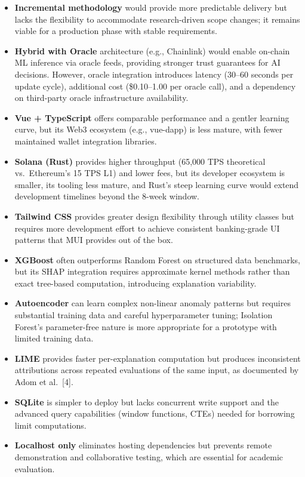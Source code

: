 \documentclass[12pt,a4paper]{report}
\begin{document}
\begin{itemize}[noitemsep]
\item \textbf{Incremental methodology} would provide more predictable delivery but lacks the flexibility to accommodate research-driven scope changes; it remains viable for a production phase with stable requirements.

\item \textbf{Hybrid with Oracle} architecture (e.g., Chainlink) would enable on-chain ML inference via oracle feeds, providing stronger trust guarantees for AI decisions. However, oracle integration introduces latency (30--60 seconds per update cycle), additional cost (\$0.10--1.00 per oracle call), and a dependency on third-party oracle infrastructure availability.

\item \textbf{Vue + TypeScript} offers comparable performance and a gentler learning curve, but its Web3 ecosystem (e.g., vue-dapp) is less mature, with fewer maintained wallet integration libraries.

\item \textbf{Solana (Rust)} provides higher throughput (65,000 TPS theoretical vs.\ Ethereum's 15 TPS L1) and lower fees, but its developer ecosystem is smaller, its tooling less mature, and Rust's steep learning curve would extend development timelines beyond the 8-week window.

\item \textbf{Tailwind CSS} provides greater design flexibility through utility classes but requires more development effort to achieve consistent banking-grade UI patterns that MUI provides out of the box.

\item \textbf{XGBoost} often outperforms Random Forest on structured data benchmarks, but its SHAP integration requires approximate kernel methods rather than exact tree-based computation, introducing explanation variability.

\item \textbf{Autoencoder} can learn complex non-linear anomaly patterns but requires substantial training data and careful hyperparameter tuning; Isolation Forest's parameter-free nature is more appropriate for a prototype with limited training data.

\item \textbf{LIME} provides faster per-explanation computation but produces inconsistent attributions across repeated evaluations of the same input, as documented by Adom et al.~[4].

\item \textbf{SQLite} is simpler to deploy but lacks concurrent write support and the advanced query capabilities (window functions, CTEs) needed for borrowing limit computations.

\item \textbf{Localhost only} eliminates hosting dependencies but prevents remote demonstration and collaborative testing, which are essential for academic evaluation.
\end{itemize}
\end{document}
